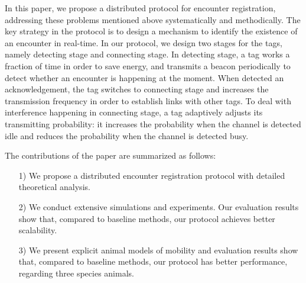 


In this paper, we propose a distributed protocol for encounter registration, 
addressing these problems mentioned above systematically and
methodically. 
The key strategy in the protocol is to design a mechanism
to identify the existence of an encounter in real-time. 
In our protocol, we design two stages for the tags, 
namely detecting stage and connecting stage.
In detecting stage, a tag works a fraction of time in order to save energy,
and transmits a beacon periodically to detect whether an encounter is happening at the moment.
When detected an acknowledgement, the tag switches to connecting stage and increases the 
transmission frequency in order to establish links with other tags. To deal with interference 
happening in connecting stage,
a tag adaptively adjusts its transmitting probability: it increases the probability when 
the channel is detected idle and reduces the probability when the channel is detected busy.  


The contributions of the paper are summarized as follows:
\begin{itemize}
\item[1)] We propose a distributed encounter registration protocol  
with detailed theoretical analysis. 
\item[2)] We conduct extensive simulations and experiments. Our evaluation results show that, 
compared to baseline methods, our protocol achieves better scalability.
\item[3)] We present explicit animal models of mobility and evaluation results show that,
compared to baseline methods, our protocol has better performance, regarding three species animals. 
\end{itemize}


